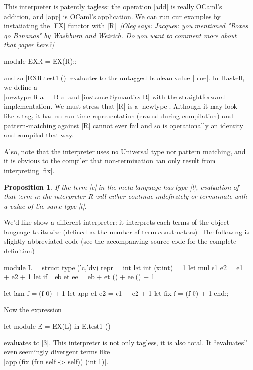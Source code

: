 \documentclass[preprint]{sigplanconf}
\newcommand{\oleg}[1]{{\it [Oleg says: #1]}}
\newtheorem{prop}{Proposition}
\begin{document}
This interpreter is patently tagless: the operation |add| is really
OCaml's addition, and |app| is OCaml's application. We can run our
examples by instatiating the |EX| functor with |R|.
\oleg{Jacques: you mentioned "Boxes go Bananas" by Washburn and
  Weirich. Do you want to comment more about that paper here?}

\noindent
\begin{code}
  module EXR = EX(R);;
\end{code}

\noindent and so |EXR.test1 ()| evaluates to the untagged boolean value |true|.
In Haskell, we define a\\
|newtype R a = R a| and |instance Symantics R|
with the straightforward implementation. We must stress that |R| is
a |newtype|. Although it may look like a tag, it has no run-time
representation (erased during compilation) and pattern-matching
against |R| cannot ever fail and so is operationally an identity and
compiled that way.

Also, note that the interpreter uses no Universal type nor pattern
matching, and it is obvious to the compiler that non-termination can
only result from interpreting |fix|.

\begin{prop}
If the term |e| in the meta-language has type
|t|, evaluation of that term in the interpreter R will either continue
indefinitely or termninate with a value of the same type |t|.
\end{prop}

We'd like show a different interpreter: it interprets each terms of
the object language to its size (defined as the number of term
constructors). The following is slightly abbreviated code (see the
accompanying source code for the complete definition).
 
\begin{code}
module L = struct
  type ('c,'dv) repr = int
  let int (x:int) = 1
  let mul e1 e2 = e1 + e2 + 1
  let if_ eb et ee = eb + et () + ee () + 1

  let lam f = (f 0) + 1
  let app e1 e2 = e1 + e2 + 1
  let fix f = (f 0) + 1
end;;
\end{code}

\noindent Now the expression
\begin{code}
  let module E = EX(L) in E.test1 ()
\end{code}
evaluates to |3|. This interpreter is not only tagless, it is also
total. It ``evaluates'' even seemingly divergent terms like\\
|app (fix (fun self -> self)) (int 1)|.
\end{document}
